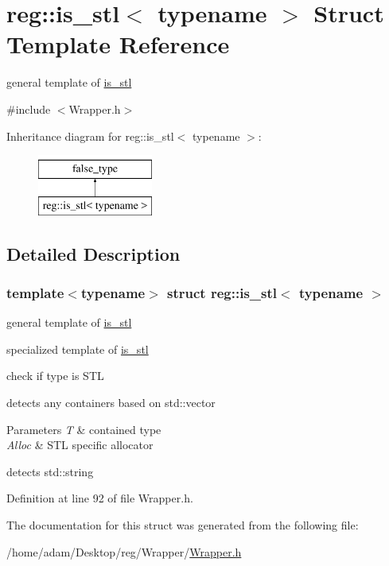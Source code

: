 \hypertarget{structreg_1_1is__stl}{}\section{reg\+:\+:is\+\_\+stl$<$ typename $>$ Struct Template Reference}
\label{structreg_1_1is__stl}


general template of \hyperlink{structreg_1_1is__stl}{is\+\_\+stl}  




{\ttfamily \#include $<$Wrapper.\+h$>$}

Inheritance diagram for reg\+:\+:is\+\_\+stl$<$ typename $>$\+:\begin{figure}[H]
\begin{center}
\leavevmode
\includegraphics[height=2.000000cm]{structreg_1_1is__stl}
\end{center}
\end{figure}


\subsection{Detailed Description}
\subsubsection*{template$<$typename$>$\newline
struct reg\+::is\+\_\+stl$<$ typename $>$}

general template of \hyperlink{structreg_1_1is__stl}{is\+\_\+stl} 

specialized template of \hyperlink{structreg_1_1is__stl}{is\+\_\+stl}

check if type is S\+TL

detects any containers based on std\+::vector 
\begin{DoxyParams}{Parameters}
{\em T} & contained type \\
\hline
{\em Alloc} & S\+TL specific allocator\\
\hline
\end{DoxyParams}
detects std\+::string 

Definition at line 92 of file Wrapper.\+h.



The documentation for this struct was generated from the following file\+:\begin{DoxyCompactItemize}
\item 
/home/adam/\+Desktop/reg/\+Wrapper/\hyperlink{_wrapper_8h}{Wrapper.\+h}\end{DoxyCompactItemize}
